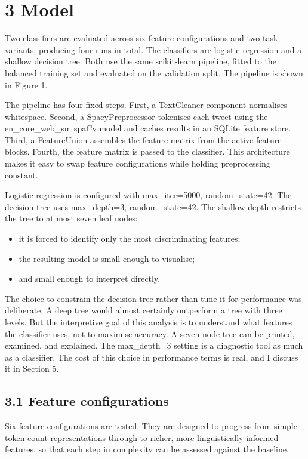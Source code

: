 \documentclass[12pt]{article}
\begin{document}
\section*{3 Model}

Two classifiers are evaluated across six feature configurations and two task variants, producing four runs in total. The classifiers are logistic regression and a shallow decision tree. Both use the same scikit-learn pipeline, fitted to the balanced training set and evaluated on the validation split. The pipeline is shown in Figure 1.

The pipeline has four fixed steps. First, a TextCleaner component normalises whitespace. Second, a SpacyPreprocessor tokenises each tweet using the en\_core\_web\_sm spaCy model and caches results in an SQLite feature store. Third, a FeatureUnion assembles the feature matrix from the active feature blocks. Fourth, the feature matrix is passed to the classifier. This architecture makes it easy to swap feature configurations while holding preprocessing constant.

Logistic regression is configured with max\_iter=5000, random\_state=42. The decision tree uses max\_depth=3, random\_state=42. The shallow depth restricts the tree to at most seven leaf nodes:
\begin{itemize}
  \item it is forced to identify only the most discriminating features;
  \item the resulting model is small enough to visualise;
  \item and small enough to interpret directly.
\end{itemize}

The choice to constrain the decision tree rather than tune it for performance was deliberate. A deep tree would almost certainly outperform a tree with three levels. But the interpretive goal of this analysis is to understand what features the classifier uses, not to maximise accuracy. A seven-node tree can be printed, examined, and explained. The max\_depth=3 setting is a diagnostic tool as much as a classifier. The cost of this choice in performance terms is real, and I discuss it in Section 5.

\subsection*{3.1 Feature configurations}

Six feature configurations are tested. They are designed to progress from simple token-count representations through to richer, more linguistically informed features, so that each step in complexity can be assessed against the baseline.
\end{document}
